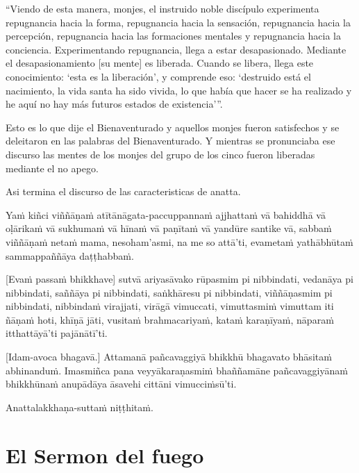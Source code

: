 “Viendo de esta manera, monjes, el instruido noble discípulo experimenta repugnancia hacia la forma, repugnancia hacia la sensación, repugnancia hacia la percepción, repugnancia hacia las formaciones mentales y repugnancia hacia la conciencia. Experimentando repugnancia, llega a estar desapasionado. Mediante el desapasionamiento [su mente] es liberada. Cuando se libera, llega este conocimiento: ‘esta es la liberación’, y comprende eso: ‘destruido está el nacimiento, la vida santa ha sido vivida, lo que había que hacer se ha realizado y he aquí no hay más futuros estados de existencia’”.

Esto es lo que dije el Bienaventurado y aquellos monjes fueron satisfechos y se deleitaron en las palabras del Bienaventurado. Y mientras se pronunciaba ese discurso las mentes de los monjes del grupo de los cinco fueron liberadas mediante el no apego.

Asi termina el discurso de las caracteristicas de anatta.

\clearpage

\paliText
\markboth{\paliTitle}{\rightmark}

Yaṁ kiñci viññāṇaṁ atītānāgata-paccuppannaṁ ajjhattaṁ vā bahiddhā vā
oḷārikaṁ vā sukhumaṁ vā hīnaṁ vā paṇītaṁ vā yandūre santike vā, sabbaṁ
viññāṇaṁ netaṁ mama, nesoham'asmi, na me so attā'ti, evametaṁ yathābhūtaṁ
sammappaññāya daṭṭhabbaṁ.

[Evaṁ passaṁ bhikkhave] sutvā ariyasāvako rūpasmim pi nibbindati, vedanāya
pi nibbindati, saññāya pi nibbindati, saṅkhāresu pi nibbindati,
viññāṇasmim pi nibbindati, nibbindaṁ virajjati, virāgā vimuccati,
vimuttasmiṁ vimuttam iti ñāṇaṁ hoti, khīṇā jāti, vusitaṁ brahmacariyaṁ,
kataṁ karaṇīyaṁ, nāparaṁ itthattāyā'ti pajānātī'ti.

[Idam-avoca bhagavā.] Attamanā pañcavaggiyā bhikkhū bhagavato bhāsitaṁ
abhinanduṁ. Imasmiñca pana veyyākaraṇasmiṁ bhaññamāne pañcavaggiyānaṁ
bhikkhūnaṁ anupādāya āsavehi cittāni vimucciṁsū'ti.

Anattalakkhaṇa-suttaṁ niṭṭhitaṁ.

\chapterTocDelegatePageNumber
\chapter{El Sermon del fuego}

\setTocDelegatedPageNumber
\englishText
\renewcommand{\englishTitle}{The Fire Sermon}

